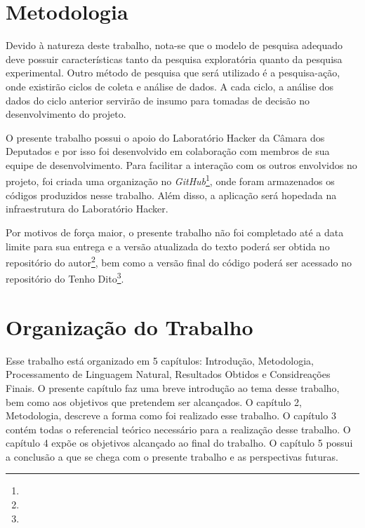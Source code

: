 \section{Metodologia}
\label{sub:metodologia}

Devido à natureza deste trabalho, nota-se que o modelo de pesquisa adequado deve possuir características tanto da pesquisa exploratória quanto da pesquisa experimental. Outro método de pesquisa que será utilizado é a pesquisa-ação, onde existirão ciclos de coleta e análise de dados. A cada ciclo, a análise dos dados do ciclo anterior servirão de insumo para tomadas de decisão no desenvolvimento do projeto.

O presente trabalho possui o apoio do Laboratório Hacker da Câmara dos Deputados e por isso foi desenvolvido em colaboração com membros de sua equipe de desenvolvimento. Para facilitar a interação com os outros envolvidos no projeto, foi criada uma organização no \textit{GitHub}\footnote{}, onde foram armazenados os códigos produzidos nesse trabalho. Além disso, a aplicação será hopedada na infraestrutura do Laboratório Hacker.

Por motivos de força maior, o presente trabalho não foi completado até a data limite para sua entrega e a versão atualizada do texto poderá ser obtida no repositório do autor\footnote{}, bem como a versão final do código poderá ser acessado no repositório do Tenho Dito\footnote{}.

\section{Organização do Trabalho}
\label{sec:organização_do_trabalho}

Esse trabalho está organizado em 5 capítulos: Introdução, Metodologia, Processamento de Linguagem Natural, Resultados Obtidos e Considreações Finais. O presente capítulo faz uma breve introdução ao tema desse trabalho, bem como aos objetivos que pretendem ser alcançados. O capítulo 2, Metodologia, descreve a forma como foi realizado esse trabalho. O capítulo 3 contém todas o referencial teórico necessário para a realização desse trabalho. O capítulo 4 expõe os objetivos alcançado ao final do trabalho. O capítulo 5 possui a conclusão a que se chega com o presente trabalho e as perspectivas futuras.
